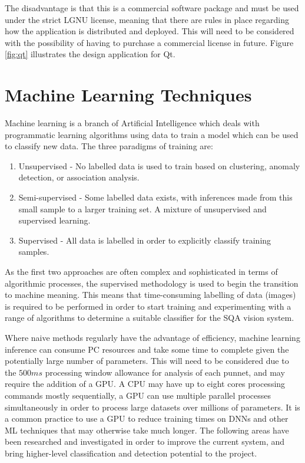 \documentclass[fleqn,twoside,12pt]{report}
\begin{document}
The disadvantage is that this is a commercial software package and must be used under the strict LGNU license, meaning that there are rules in place regarding how the application is distributed and deployed. This will need to be considered with the possibility of having to purchase a commercial license in future. Figure \ref{fig:qt} illustrates the design application for Qt\textregistered.



\section{Machine Learning Techniques}

Machine learning is a branch of Artificial Intelligence which deals with programmatic learning algorithms using data to train a model which can be used to classify new data. The three paradigms of training are:

\begin{enumerate}
	\item Unsupervised - No labelled data is used to train based on clustering, anomaly detection, or association analysis.
	\item Semi-supervised - Some labelled data exists, with inferences made from this small sample to a larger training set. A mixture of unsupervised and supervised learning.
	\item Supervised - All data is labelled in order to explicitly classify training samples.
\end{enumerate} 

As the first two approaches are often complex and sophisticated in terms of algorithmic processes, the supervised methodology is used to begin the transition to machine meaning. This means that time-consuming labelling of data (images) is required to be performed in order to start training and experimenting with a range of algorithms to determine a suitable classifier for the SQA vision system.

Where naive methods regularly have the advantage of efficiency, machine learning inference can consume PC resources and take some time to complete given the potentially large number of parameters. This will need to be considered due to the $500ms$ processing window allowance for analysis of each punnet, and may require the addition of a GPU. A CPU may have up to eight cores processing commands mostly sequentially, a GPU can use multiple parallel processes simultaneously in order to process large datasets over millions of parameters. It is a common practice to use a GPU to reduce training times on DNNs and other ML techniques that may otherwise take much longer. The following areas have been researched and investigated in order to improve the current system, and bring higher-level classification and detection potential to the project.
\end{document}
